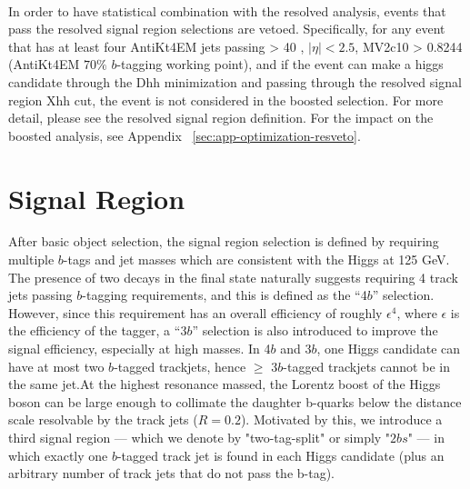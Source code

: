 \paragraph{}
In order to have statistical combination with the resolved analysis, events that pass the resolved signal region selections are vetoed. Specifically, for any event that has at least four AntiKt4EM jets passing \pt > 40 \GeV, $|\eta| < 2.5$, MV2c10 > 0.8244 (AntiKt4EM $70\%$ $b$-tagging working point), and if the event can make a higgs candidate through the Dhh minimization and passing through the resolved signal region Xhh cut, the event is not considered in the boosted selection. For more detail, please see the resolved signal region definition. For the impact on the boosted analysis, see Appendix ~\ref{sec:app-optimization-resveto}.


\section{Signal Region}
After basic object selection, the signal region selection is defined by requiring multiple $b$-tags and jet masses which are consistent with the Higgs at 125 GeV. The presence of two \hbb decays in the final state naturally suggests requiring 4 track jets passing $b$-tagging requirements, and this is defined as the ``4$b$'' selection. However, since this requirement has an overall efficiency of roughly $\epsilon^4$, where $\epsilon$ is the efficiency of the tagger, a ``3$b$'' selection is also introduced to improve the signal efficiency, especially at high masses. In 4$b$ and 3$b$, one Higgs candidate can have at most two $b$-tagged trackjets, hence $\geq$ 3$b$-tagged trackjets cannot be in the same \largeR jet.At the highest resonance massed, the Lorentz boost of the Higgs boson can be large enough to collimate the daughter b-quarks below the distance scale resolvable by the track jets ($R=0.2$). Motivated by this, we introduce a third signal region --- which we denote by "two-tag-split" or simply  "$2bs$" --- in which exactly one $b$-tagged track jet is found in each Higgs candidate (plus an arbitrary number of track jets that do not pass the b-tag).


